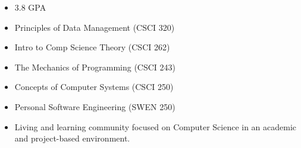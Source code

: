 \begin{itemize}
    \item 3.8 GPA 
  \end{itemize}

\begin{itemize}
    \item Principles of Data Management (CSCI 320)
    \item Intro to Comp Science Theory (CSCI 262)
    \item The Mechanics of Programming (CSCI 243)
    \item Concepts of Computer Systems (CSCI 250)
    \item Personal Software Engineering (SWEN 250)
\end{itemize}


\smallskip
\newline



\begin{itemize}
    \item Living and learning community focused on Computer Science in an academic and project-based environment.
  \end{itemize}
